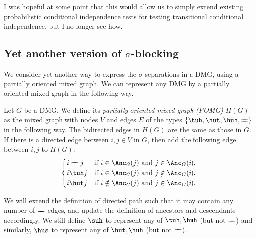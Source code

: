 I was hopeful at some point that this would allow us to simply extend existing probabilistic conditional independence tests for testing transitional conditional independence, but I no longer see how.

\subsection{Yet another version of $\sigma$-blocking}

\newcommand\otto{\mathrel{{\Relbar\mkern-9mu\Relbar}}}

We consider yet another way to express the $\sigma$-separations in a DMG, using a partially oriented mixed graph.
We can represent any DMG by a partially oriented mixed graph in the following way.
\begin{Def}\label{def:partially_oriented_mixed_graph}
  Let $G$ be a DMG. 
  We define its \emph{partially oriented mixed graph (POMG)} $H(G)$ as the mixed graph with nodes $V$ and edges $E$ of the types $\{\tuh,\hut,\huh,\otto\}$ in the following way.
  The bidirected edges in $H(G)$ are the same as those in $G$.
  If there is a directed edge between $i,j \in V$ in $G$, then add the following edge between $i,j$ to $H(G)$:
    $$\begin{cases}
      \text{$i \otto j$} & \text{if $i \in \Anc_G(j)$ and $j \in \Anc_G(i)$}, \\
      \text{$i \tuh  j$} & \text{if $i \in \Anc_G(j)$ and $j \notin \Anc_G(i)$}, \\
      \text{$i \hut  j$} & \text{if $i \notin \Anc_G(j)$ and $j \in \Anc_G(i)$}.
    \end{cases}$$
\end{Def}
We will extend the definition of directed path such that it may contain any number of $\otto$ edges, and update the definition of ancestors and descendants accordingly.
We still define $\suh$ to represent any of $\tuh, \huh$ (but not $\otto$) and similarly,
$\hus$ to represent any of $\hut, \huh$ (but not $\otto$).

